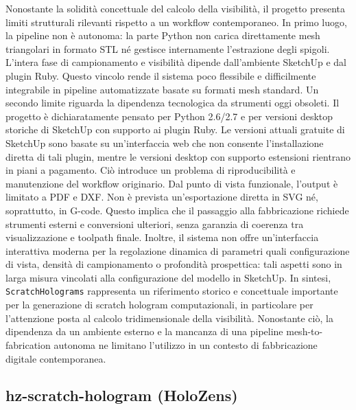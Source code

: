 \documentclass[a4paper,11pt,titlepage,twoside]{book}
\newcommand{\1}{\mathbf{1}}
\numberwithin{equation}{chapter}
\theoremstyle{plain}
\theoremstyle{definition}
\begin{document}
	Nonostante la solidità concettuale del calcolo della visibilità, il progetto presenta limiti strutturali rilevanti rispetto a un workflow contemporaneo. In primo luogo, la pipeline non è autonoma: la parte Python non carica direttamente mesh triangolari in formato STL né gestisce internamente l’estrazione degli spigoli. L’intera fase di campionamento e visibilità dipende dall’ambiente SketchUp e dal plugin Ruby. Questo vincolo rende il sistema poco flessibile e difficilmente integrabile in pipeline automatizzate basate su formati mesh standard.
	Un secondo limite riguarda la dipendenza tecnologica da strumenti oggi obsoleti. Il progetto è dichiaratamente pensato per Python 2.6/2.7 e per versioni desktop storiche di SketchUp con supporto ai plugin Ruby. Le versioni attuali gratuite di SketchUp sono basate su un’interfaccia web che non consente l’installazione diretta di tali plugin, mentre le versioni desktop con supporto estensioni rientrano in piani a pagamento. Ciò introduce un problema di riproducibilità e manutenzione del workflow originario.
	Dal punto di vista funzionale, l’output è limitato a PDF e DXF. Non è prevista un’esportazione diretta in SVG né, soprattutto, in G-code. Questo implica che il passaggio alla fabbricazione richiede strumenti esterni e conversioni ulteriori, senza garanzia di coerenza tra visualizzazione e toolpath finale. Inoltre, il sistema non offre un’interfaccia interattiva moderna per la regolazione dinamica di parametri quali configurazione di vista, densità di campionamento o profondità prospettica: tali aspetti sono in larga misura vincolati alla configurazione del modello in SketchUp.
	In sintesi, \texttt{ScratchHolograms} rappresenta un riferimento storico e concettuale importante per la generazione di scratch hologram computazionali, in particolare per l’attenzione posta al calcolo tridimensionale della visibilità. Nonostante ciò, la dipendenza da un ambiente esterno e la mancanza di una pipeline mesh-to-fabrication autonoma ne limitano l’utilizzo in un contesto di fabbricazione digitale contemporanea.
	
	\subsection{hz-scratch-hologram (HoloZens)}
	
\end{document}
